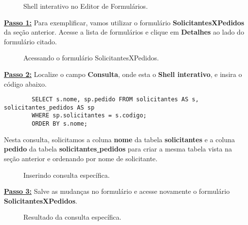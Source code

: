 \documentclass[9pt]{report}
\begin{document}
{      \begin{figure}[H]
        \caption{Shell interativo no Editor de Formulários.}
        \label{fig:shellconsulta}
      \end{figure}

      \underline{\textbf{Passo 1:}} Para exemplificar, vamos utilizar
      o formulário \textbf{SolicitantesXPedidos} da seção anterior.
      Acesse a lista de formulários e clique em \textbf{Detalhes} ao
      lado do formulário citado.
      
      \begin{figure}[H]
        \caption{Acessando o formulário SolicitantesXPedidos.}
        \label{fig:editorformSP}
      \end{figure}

      \underline{\textbf{Passo 2:}} Localize o campo
      \textbf{Consulta}, onde esta o \textbf{Shell interativo}, e
      insira o código abaixo.

      \begin{lstlisting}        
        SELECT s.nome, sp.pedido FROM solicitantes AS s, solicitantes_pedidos AS sp
        WHERE sp.solicitantes = s.codigo;
        ORDER BY s.nome;  
      \end{lstlisting}

      Nesta consulta, solicitamos a coluna \textbf{nome} da tabela
      \textbf{solicitantes} e a coluna \textbf{pedido} da tabela
      \textbf{solicitantes\underline{ }pedidos} para criar a mesma
      tabela vista na seção anterior e ordenando por nome de
      solicitante.

      \begin{figure}[H]
        \caption{Inserindo consulta específica.}
        \label{fig:consultaesp}
      \end{figure}

      \underline{\textbf{Passo 3:}} Salve as mudanças no formulário
      e acesse novamente o formulário \textbf{SolicitantesXPedidos}.

      \begin{figure}[H]
        \caption{Resultado da consulta específica.}
        \label{fig:consultaespresult}
      \end{figure}

}
\end{document}
